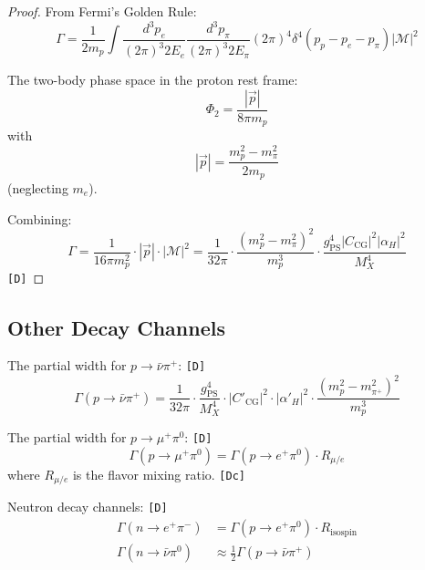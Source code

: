\documentclass[11pt,a4paper]{article}
\newcommand{\tagD}{\textcolor{green!50!black}{\texttt{[D]}}}
\newcommand{\tagDc}{\textcolor{blue!70!black}{\texttt{[Dc]}}}
\theoremstyle{definition}
\begin{document}
\begin{proof}
From Fermi's Golden Rule:
\begin{equation}
\label{eq:golden-rule}
\Gamma = \frac{1}{2m_p} \int \frac{d^3 p_e}{(2\pi)^3 2E_e}
\frac{d^3 p_\pi}{(2\pi)^3 2E_\pi} (2\pi)^4 \delta^4(p_p - p_e - p_\pi) |\mathcal{M}|^2
\end{equation}

The two-body phase space in the proton rest frame:
\begin{equation}
\label{eq:phase-space}
\Phi_2 = \frac{|\vec{p}|}{8\pi m_p}
\end{equation}
with
\begin{equation}
\label{eq:momentum}
|\vec{p}| = \frac{m_p^2 - m_\pi^2}{2m_p}
\end{equation}
(neglecting $m_e$).

Combining:
\begin{equation}
\label{eq:width-derivation}
\Gamma = \frac{1}{16\pi m_p^2} \cdot |\vec{p}| \cdot |\mathcal{M}|^2
= \frac{1}{32\pi} \cdot \frac{(m_p^2 - m_\pi^2)^2}{m_p^3} \cdot
\frac{g_{\text{PS}}^4 |C_{\text{CG}}|^2 |\alpha_H|^2}{M_X^4}
\end{equation}
\tagD{}
\end{proof}

\subsection{Other Decay Channels}
\label{subsec:other-channels}

The partial width for $p \to \bar{\nu} \pi^+$: \tagD{}
\begin{equation}
\label{eq:width-nupi}
\Gamma(p \to \bar{\nu} \pi^+) = \frac{1}{32\pi} \cdot
\frac{g_{\text{PS}}^4}{M_X^4} \cdot |C'_{\text{CG}}|^2 \cdot |\alpha'_H|^2 \cdot
\frac{(m_p^2 - m_{\pi^+}^2)^2}{m_p^3}
\end{equation}

The partial width for $p \to \mu^+ \pi^0$: \tagD{}
\begin{equation}
\label{eq:width-mupi}
\Gamma(p \to \mu^+ \pi^0) = \Gamma(p \to e^+ \pi^0) \cdot R_{\mu/e}
\end{equation}
where $R_{\mu/e}$ is the flavor mixing ratio. \tagDc{}

Neutron decay channels: \tagD{}
\begin{align}
\label{eq:n-decay-1}
\Gamma(n \to e^+ \pi^-) &= \Gamma(p \to e^+ \pi^0) \cdot R_{\text{isospin}} \\
\label{eq:n-decay-2}
\Gamma(n \to \bar{\nu} \pi^0) &\approx \frac{1}{2} \Gamma(p \to \bar{\nu} \pi^+)
\end{align}
\end{document}
